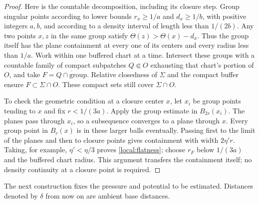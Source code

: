\documentclass[11pt]{article}
\numberwithin{equation}{section}
\theoremstyle{definition}
\theoremstyle{remark}
\begin{document}
\begin{proof}
Here is the countable decomposition, including its closure step.
Group singular points according to lower bounds
$r_x\ge1/a$ and $d_x\ge1/b$, with positive integers $a,b$, and according
to a density interval of length less than $1/(2b)$.  Any two points
$x,z$ in the same group satisfy $\Theta(z)>\Theta(x)-d_x$.
Thus the group itself has the plane containment at every one of its
centers and every radius less than $1/a$.  Work within one buffered chart at a time.  Intersect these groups
with a countable family of compact subpatches $Q\Subset O$ exhausting
that chart's portion of $O$, and take
$F=\overline{Q\cap\text{group}}$.  Relative closedness of $\Sigma$
and the compact buffer ensure $F\subset\Sigma\cap O$.
These compact sets still cover $\Sigma\cap O$.

To check the geometric condition at a closure center $x$, let
$x_i$ be group points tending to $x$ and fix $r<1/(3a)$.  Apply the
group estimate in $B_{2r}(x_i)$.  The planes pass through $x_i$, so a
subsequence converges to a plane through $x$.  Every group point in
$B_r(x)$ is in these larger balls eventually.  Passing first to the
limit of the planes and then to closure points gives containment with
width $2\eta'r$.  Taking, for example, $\eta'<\eta/3$ proves
\eqref{local:flatness}; choose $r_F$ below $1/(3a)$ and the buffered
chart radius.  This argument transfers the containment
itself; no density continuity at a closure point is required.
\end{proof}

The next construction fixes the pressure and potential to be estimated.
Distances denoted by $\delta$ from now on are ambient base distances.
\end{document}

